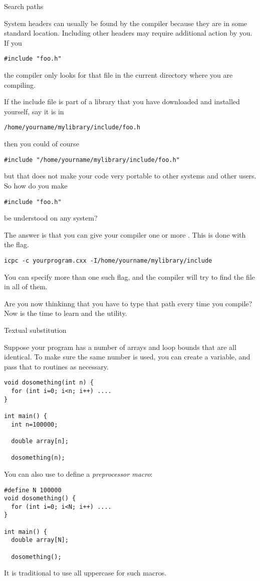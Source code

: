  {Search paths}

System headers can usually be found by the compiler because they
are in some standard location.
Including other headers may require additional action by you.
If you 
\begin{lstlisting}
#include "foo.h"
\end{lstlisting}
the compiler only looks for that file in the current directory
where you are compiling.

If the include file is part of a library that you have downloaded
and installed yourself, say it is in
\begin{verbatim}
/home/yourname/mylibrary/include/foo.h
\end{verbatim}
then you could of course
\begin{lstlisting}
#include "/home/yourname/mylibrary/include/foo.h"
\end{lstlisting}
but that does not make your code very portable to other systems
and other users.
So how do you make
\begin{lstlisting}
#include "foo.h"
\end{lstlisting}
be understood on any system?

The answer is that you can give your compiler one or more .
This is done with the  flag.
\begin{verbatim}
icpc -c yourprogram.cxx -I/home/yourname/mylibrary/include
\end{verbatim}
You can specify more than one such flag, and the compiler will try to find
the  file in all of them.

Are you now thinkinng that you have to type that path every time you compile?
Now is the time to learn  and the  utility.

 {Textual substitution}

Suppose your program has a number of arrays and loop bounds that are
all identical. To make sure the same number is used, you can create a
variable, and pass that to routines as necessary.
\begin{lstlisting}
void dosomething(int n) {
  for (int i=0; i<n; i++) ....
}

int main() {
  int n=100000;

  double array[n];
   
  dosomething(n);
\end{lstlisting}
You can also use  to define a
\emph{preprocessor macro}:
\begin{lstlisting}
#define N 100000
void dosomething() {
  for (int i=0; i<N; i++) ....
}

int main() {
  double array[N];
   
  dosomething();
\end{lstlisting}
It is traditional to use all uppercase for such macros.

